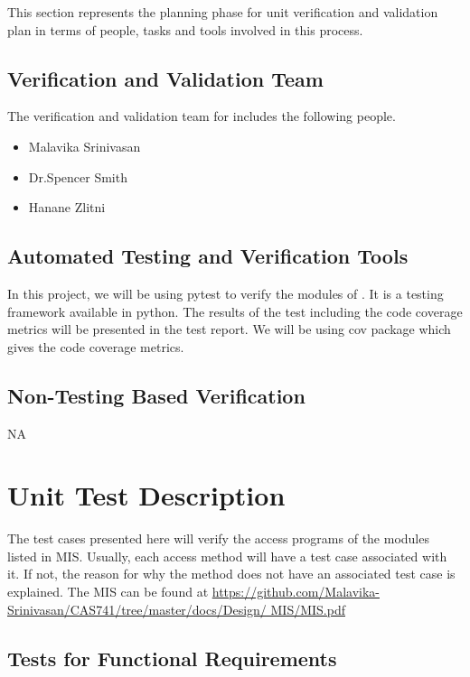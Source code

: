 \documentclass[12pt, titlepage]{article}
\begin{document}
This section represents the planning phase for unit verification and validation 
plan in terms of people, tasks and tools involved in this process.
	
\subsection{Verification and Validation Team}

The verification and validation team for \famname{} includes the following 
people.
\begin{itemize}
	\item Malavika Srinivasan 
	\item Dr.Spencer Smith 
	\item Hanane Zlitni
\end{itemize}

\subsection{Automated Testing and Verification Tools}

In this project, we will be using pytest to verify the modules of \famname{}. 
It is a testing framework available in python. The results of the test 
including the code coverage metrics will be presented in the test report. We 
will be using cov package which gives the code coverage metrics.


\subsection{Non-Testing Based Verification}

NA

\section{Unit Test Description}

The test cases presented here will verify the access programs of the modules 
listed in MIS. Usually, each access method will have a test case associated 
with it. If not, the reason for why the method does not have an associated test 
case is explained. The MIS can be found at 
\url{https://github.com/Malavika-Srinivasan/CAS741/tree/master/docs/Design/
	MIS/MIS.pdf}




\subsection{Tests for Functional Requirements}
\end{document}
